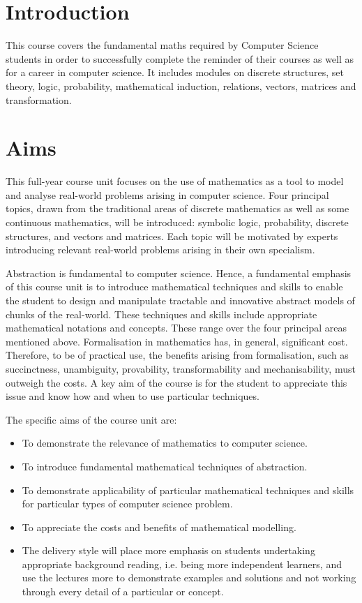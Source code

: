 \section*{Introduction}

This course covers the fundamental maths required by Computer Science students
in order to successfully complete the reminder of their courses as well as for a
career in computer science. It includes modules on discrete structures, set
theory, logic, probability, mathematical induction, relations, vectors, matrices
and transformation.

\section*{Aims}

This full-year course unit focuses on the use of mathematics as a tool to model
and analyse real-world problems arising in computer science. Four principal
topics, drawn from the traditional areas of discrete mathematics as well as some
continuous mathematics, will be introduced: symbolic logic, probability,
discrete structures, and vectors and matrices. Each topic will be motivated by
experts introducing relevant real-world problems arising in their own
specialism.

Abstraction is fundamental to computer science. Hence, a fundamental emphasis of
this course unit is to introduce mathematical techniques and skills to enable
the student to design and manipulate tractable and innovative abstract models of
chunks of the real-world. These techniques and skills include appropriate
mathematical notations and concepts. These range over the four principal areas
mentioned above. Formalisation in mathematics has, in general, significant cost.
Therefore, to be of practical use, the benefits arising from formalisation, such
as succinctness, unambiguity, provability, transformability and mechanisability,
must outweigh the costs. A key aim of the course is for the student to
appreciate this issue and know how and when to use particular techniques.

The specific aims of the course unit are:

\begin{itemize}
	\item To demonstrate the relevance of mathematics to computer science.
	\item To introduce fundamental mathematical techniques of abstraction.
	\item To demonstrate applicability of particular mathematical techniques and
		  skills for particular types of computer science problem.
	\item To appreciate the costs and benefits of mathematical modelling.
	\item The delivery style will place more emphasis on students undertaking
	      appropriate background reading, i.e. being more independent learners,
	      and use the lectures more to demonstrate examples and solutions and
	      not working through every detail of a particular or concept.
\end{itemize}

